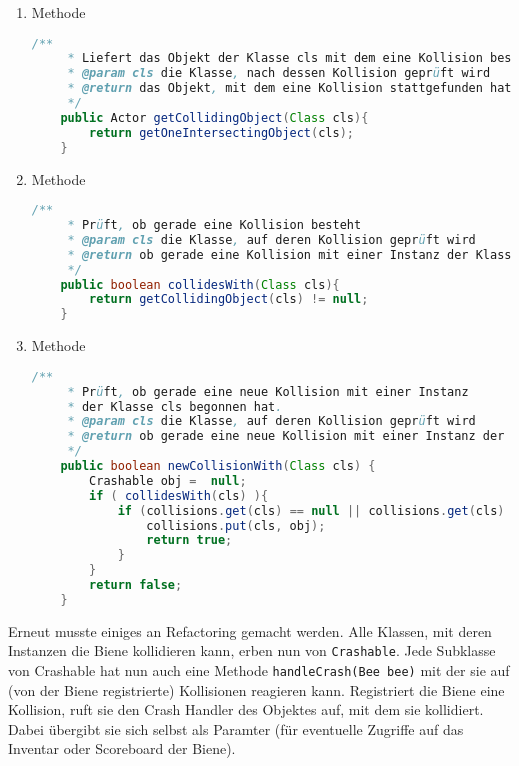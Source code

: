 \documentclass{pi1}
\begin{document}
\begin{enumerate}

\item
Methode
\begin{lstlisting}[caption={\emph{getCollidingObject(Class cls)}-Methode}, firstnumber=25, language=Java]
/**
     * Liefert das Objekt der Klasse cls mit dem eine Kollision besteht.
     * @param cls die Klasse, nach dessen Kollision geprüft wird
     * @return das Objekt, mit dem eine Kollision stattgefunden hat
     */
    public Actor getCollidingObject(Class cls){
        return getOneIntersectingObject(cls);
    }
\end{lstlisting}

\item
Methode
\begin{lstlisting}[caption={\emph{collidesWith(Class cls)}-Methode}, firstnumber=25, language=Java]
/**
     * Prüft, ob gerade eine Kollision besteht
     * @param cls die Klasse, auf deren Kollision geprüft wird
     * @return ob gerade eine Kollision mit einer Instanz der Klasse cls besteht
     */
    public boolean collidesWith(Class cls){
        return getCollidingObject(cls) != null;
    }
\end{lstlisting}

\item
Methode
\begin{lstlisting}[caption={\emph{newCollisionWith(Class cls)}-Methode}, firstnumber=25, language=Java]
/**
     * Prüft, ob gerade eine neue Kollision mit einer Instanz
     * der Klasse cls begonnen hat.
     * @param cls die Klasse, auf deren Kollision geprüft wird
     * @return ob gerade eine neue Kollision mit einer Instanz der Klasse cls begonnen hat
     */
    public boolean newCollisionWith(Class cls) {
        Crashable obj =  null;
        if ( collidesWith(cls) ){
            if (collisions.get(cls) == null || collisions.get(cls) != obj ){
                collisions.put(cls, obj);
                return true;
            }
        } 
        return false;
    }
\end{lstlisting}

\end{enumerate}

Erneut musste einiges an Refactoring gemacht werden. Alle Klassen, mit deren Instanzen die Biene  kollidieren kann, erben nun von \texttt{Crashable}. Jede Subklasse von Crashable hat nun auch eine Methode \texttt{handleCrash(Bee bee)} mit der sie auf (von der Biene registrierte) Kollisionen reagieren kann. Registriert die Biene eine Kollision, ruft sie den Crash Handler des Objektes auf, mit dem sie kollidiert. Dabei übergibt sie sich selbst als Paramter (für eventuelle Zugriffe auf das Inventar oder Scoreboard der Biene).
\end{document}
